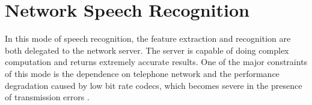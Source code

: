 \section{Network Speech Recognition}
In this mode of speech recognition, the feature extraction and recognition are both delegated to the network server. The server is capable of doing complex computation and returns extremely accurate results. One of the major constraints of this mode is the dependence on telephone network and the performance degradation caused by low bit rate codecs, which becomes severe in the presence of transmission errors \cite{Kumar_rethinkingspeech}.
